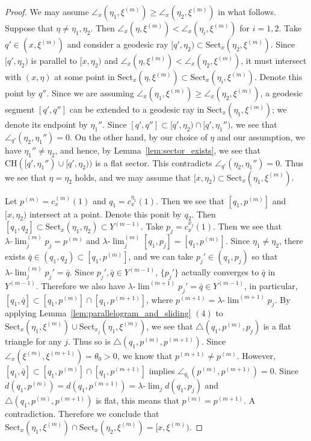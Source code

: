\documentclass[12pt]{amsart}
\numberwithin{equation}{section}
\theoremstyle{plain}
\theoremstyle{definition}
\theoremstyle{remark}
\newcommand{\uulim}[1][]{\lambda{\text{-}}\!{\lim}^{(#1)}}
\newcommand{\ulim}{\lambda{\text{-}}\!\lim}
\newcommand{\p}[1]{p^{(#1)}}
\newcommand{\xxi}[1]{\xi^{(#1)}}
\newcommand{\ray}[1]{[#1)}
\newcommand{\cc}[2]{c_{#1}^{#2}}
\newcommand{\tri}[3]{\triangle(#1,#2,#3)}
\newcommand{\ch}[1]{\mathrm{CH}(#1)}
\newcommand{\sect}[3][]{\mathrm{Sect}_{#1}(#2,#3)}
\newcommand{\zure}{\theta_0}
\begin{document}
\begin{proof}
 We may assume 
 $\angle_{x}(\eta_1,\xxi{m})\geq \angle_{x}(\eta_2,\xxi{m})$
 in what follows. 
 Suppose that $\eta\not= \eta_1, \eta_2$. 
 Then $\angle_x(\eta,\xxi{m})<\angle_x(\eta_i,\xxi{m})$ for $i=1,2$. 
 Take $q' \in (x,\xxi{m})$ and consider a geodesic ray 
 $\ray{q',\eta_2} \subset \sect[x]{\eta_2}{\xxi{m}}$. 
 Since $\ray{q',\eta_2}$ is parallel to $\ray{x,\eta_2}$ and 
 $\angle_{x}(\eta,\xxi{m})<\angle_{x}(\eta_2,\xxi{m})$, 
 it must intersect with $(x,\eta)$ at some point in
 $\sect[x]{\eta}{\xxi{m}}\subset \sect[x]{\eta_i}{\xxi{m}}$. 
 Denote this point by $q''$. 
 Since we are assuming
 $\angle_{x}(\eta_1,\xxi{m})\geq \angle_{x}(\eta_2,\xxi{m})$, 
 a geodesic segment $[q',q'']$ can be extended to a geodesic ray in 
 $\sect[x]{\eta_1}{\xxi{m}}$; we denote its endpoint by $\eta_1''$. 
 Since $[q',q''] \subset \ray{q',\eta_2}\cap \ray{q',\eta_1''}$,  
 we see that $\angle_{q'}(\eta_2,\eta_1'')=0$. 
 On the other hand, by our choice of $\eta$ and our assumption,  
 we have $\eta_1''\not=\eta_2$, and hence, 
 by Lemma~\ref{lem:sector_exists},  we see that
 $\ch{\ray{q',\eta_1''}\cup \ray{q',\eta_2}}$ is a flat sector. 
 This contradicts $\angle_{q'}(\eta_2,\eta_1'')=0$. 
 Thus we see that $\eta=\eta_2$ holds, and we may
 assume that
 $\ray{x,\eta_2}\subset \sect[x]{\eta_1}{\xxi{m}}$.

 Let $\p{m}=\cc{x}{(m)}(1)$ and $q_1 = \cc{x}{\eta_1}(1)$.
 Then we see that $[q_1,\p{m}]$ and $\ray{x,\eta_2}$ intersect at a
 point. 
 Denote this ponit by $q_2$. 
 Then $[q_1,q_2] \subset \sect[x]{\eta_1}{\eta_2}\subset Y^{(m-1)}$. 
 Take $p_j = \cc{x}{x_j}(1)$.  
 Then we see that $\uulim[m]_jp_j=\p{m}$ and
 $\uulim[m]_j[q_1,p_j]=[q_1,\p{m}]$. 
 Since $\eta_1\not= \eta_2$, there exists 
 $\bar q \in (q_1,q_2)\subset [q_1,\p{m}]$, and 
 we can take $p_j' \in (q_1,p_j)$ so that $\uulim[m]_j p_j' = \bar q$. 
 Since $p_j', \bar q  \in Y^{(m-1)}$, $\{p_j'\}$ actually converges to
 $\bar q$ in $Y^{(m-1)}$. 
 Therefore we also have $\uulim[m+1]p_j'=\bar q \in Y^{(m-1)}$, in
 particular, $[q_1,\bar q]\subset [q_1,\p{m}]\cap [q_1,\p{m+1}]$, where
 $\p{m+1}=\uulim[m+1]p_j$. 
 By applying  Lemma~\ref{lem:parallelogram_and_sliding} $(4)$ to 
 $\sect[x]{\eta_1}{\xxi{m}}\cup \sect[x_j]{\eta_1}{\xxi{m}}$, we see
 that $\tri{q_1}{\p{m}}{p_j}$ is a flat triangle for any $j$. 
 Thus so is $\tri{q_1}{\p{m}}{\p{m+1}}$.
 Since $\angle_{x}(\xxi{m},\xxi{m+1})=\zure>0$, we know that
 $\p{m+1}\not= \p{m}$. 
 However, $[q_1,\bar q]\subset [q_1,\p{m}]\cap [q_1,\p{m+1}]$ implies
 $\angle_{q_1}(\p{m},\p{m+1})=0$.  
 Since $d(q_1,\p{m})=d(q_1,\p{m+1})=\ulim_j d(q_1,p_j)$ and 
 $\tri{q_1}{\p{m}}{\p{m+1}}$ is flat, this means that 
 $\p{m}=\p{m+1}$. 
 A contradiction. 
 Therefore we conclude that 
 $\sect[x]{\eta_1}{\xxi{m}}\cap\sect[x]{\eta_2}{\xxi{m}}=\ray{x,\xxi{m}}$.


\end{proof}
\end{document}
